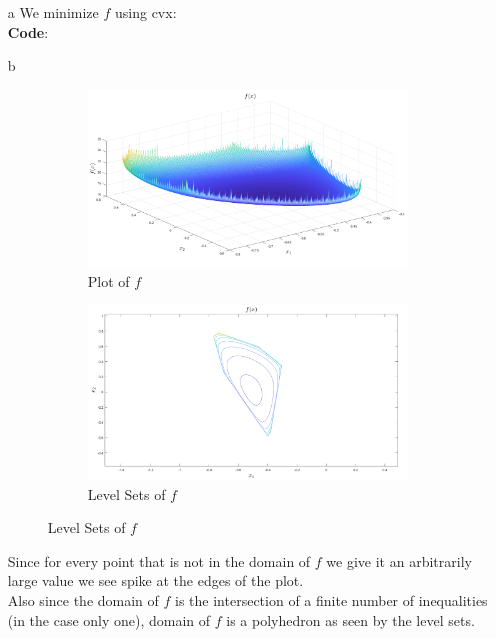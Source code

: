 \documentclass[12pt]{article}
\begin{document}
\begin{enumerate}
\begin{enumerate}
		\item[a]
		We minimize $f$ using cvx:\\
		{\bf Code}:
		
		\newpage
		\item[b]
		\begin{figure}
			\centering
			\begin{subfigure}[b]{0.45\textwidth}
				\centering
				\includegraphics[width=\textwidth]{C_b_1.png}
				\caption{Plot of $f$}
			\end{subfigure}
			\hfill
			\begin{subfigure}[b]{0.45\textwidth}
				\centering
				\includegraphics[width=\textwidth]{C_b_2.png}
				\caption{Level Sets of $f$}
			\end{subfigure}
		\end{figure}
		Since for every point that is not in the domain of $f$ we give it an arbitrarily large value we see spike at the edges of the plot.\\
		Also since the domain of $f$ is the intersection of a finite number of inequalities (in the case only one), domain of $f$ is a polyhedron as seen by the level sets.
		

\end{enumerate}
\end{enumerate}
\end{document}
